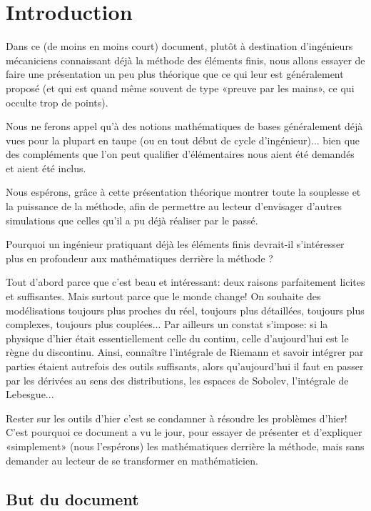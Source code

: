 \documentclass[11pt,pdflatex]{book}
\begin{document}
\chapter*{Introduction}
\ifVersionDuDocEstVincent\else{}\fi
{}

Dans ce (de moins en moins court) document, plutôt à destination d'ingénieurs mécaniciens  connaissant déjà la méthode des éléments finis, nous allons essayer de faire une présentation un peu plus théorique que ce qui leur est généralement proposé (et qui est quand même souvent de type «preuve par les mains», ce qui occulte trop de points).

Nous ne ferons appel qu'à des notions mathématiques de bases généralement déjà vues pour la plupart en taupe (ou en tout début de cycle d'ingénieur)... bien que des compléments que l'on peut qualifier d'élémentaires nous aient été demandés et aient été inclus.

Nous espérons, grâce à cette présentation théorique montrer toute la souplesse et la puissance de la méthode, afin de permettre au lecteur d'envisager d'autres simulations que celles qu'il a pu déjà réaliser par le passé.

\medskip
Pourquoi un ingénieur pratiquant déjà les éléments finis devrait-il s'intéresser plus en profondeur aux mathématiques derrière la méthode ?

Tout d'abord parce que c'est beau et intéressant: deux raisons parfaitement licites et suffisantes. Mais surtout parce que le monde change! On souhaite des modélisations toujours plus proches du réel, toujours plus détaillées, toujours plus complexes, toujours plus couplées... Par ailleurs un constat s'impose: si la physique d'hier était essentiellement celle du continu, celle d'aujourd'hui est le règne du discontinu. Ainsi, connaître l'intégrale de Riemann et savoir intégrer par parties étaient autrefois des outils suffisants, alors qu'aujourd'hui il faut en passer par les dérivées au sens des distributions, les espaces de Sobolev, l'intégrale de Lebesgue...

Rester sur les outils d'hier c'est se condamner à résoudre les problèmes d'hier! C'est pourquoi ce document a vu le jour, pour essayer de présenter et d'expliquer «simplement» (nous l'espérons) les mathématiques derrière la méthode, mais sans demander au lecteur de se transformer en mathématicien.


\bigskip
\section*{But du document}
\end{document}
